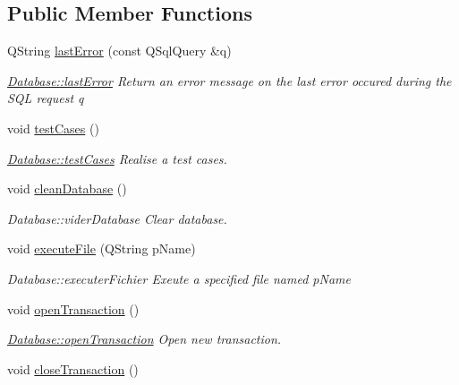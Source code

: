 \subsection*{Public Member Functions}
\begin{DoxyCompactItemize}
\item 
Q\-String \hyperlink{classDatabase_a17465cc3fe0a8b853f96599e0584cc84}{last\-Error} (const Q\-Sql\-Query \&q)
\begin{DoxyCompactList}\small\item\em \hyperlink{classDatabase_a17465cc3fe0a8b853f96599e0584cc84}{Database\-::last\-Error} Return an error message on the last error occured during the S\-Q\-L request {\itshape q} \end{DoxyCompactList}\item 
void \hyperlink{classDatabase_a702ce00658c10518d2ddbbd234a0c67d}{test\-Cases} ()
\begin{DoxyCompactList}\small\item\em \hyperlink{classDatabase_a702ce00658c10518d2ddbbd234a0c67d}{Database\-::test\-Cases} Realise a test cases. \end{DoxyCompactList}\item 
\hypertarget{classDatabase_a6c7ca19f0107fdad000c268fc2b14ac0}{void \hyperlink{classDatabase_a6c7ca19f0107fdad000c268fc2b14ac0}{clean\-Database} ()}\label{classDatabase_a6c7ca19f0107fdad000c268fc2b14ac0}

\begin{DoxyCompactList}\small\item\em Database\-::vider\-Database Clear database. \end{DoxyCompactList}\item 
void \hyperlink{classDatabase_a06216acb010c0ea93ac2a53aa46256c2}{execute\-File} (Q\-String p\-Name)
\begin{DoxyCompactList}\small\item\em Database\-::executer\-Fichier Exeute a specified file named {\itshape p\-Name} \end{DoxyCompactList}\item 
\hypertarget{classDatabase_ace56e75784477e79197485e9b5980804}{void \hyperlink{classDatabase_ace56e75784477e79197485e9b5980804}{open\-Transaction} ()}\label{classDatabase_ace56e75784477e79197485e9b5980804}

\begin{DoxyCompactList}\small\item\em \hyperlink{classDatabase_ace56e75784477e79197485e9b5980804}{Database\-::open\-Transaction} Open new transaction. \end{DoxyCompactList}\item 
\hypertarget{classDatabase_a8322990bcba006d0d82ac069ad6e0307}{void \hyperlink{classDatabase_a8322990bcba006d0d82ac069ad6e0307}{close\-Transaction} ()}\label{classDatabase_a8322990bcba006d0d82ac069ad6e0307}


\end{DoxyCompactItemize}
